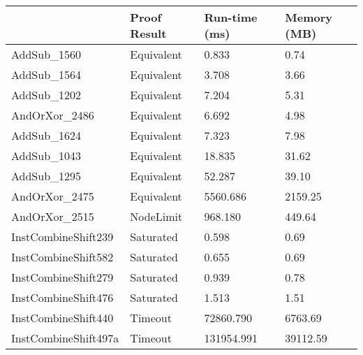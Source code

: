 \begin{tabular}{llll}
\toprule
 & Proof Result & Run-time (ms) & Memory (MB) \\
\midrule
AddSub\_1560 & Equivalent & 0.833 & 0.74 \\
AddSub\_1564 & Equivalent & 3.708 & 3.66 \\
AddSub\_1202 & Equivalent & 7.204 & 5.31 \\
AndOrXor\_2486 & Equivalent & 6.692 & 4.98 \\
AddSub\_1624 & Equivalent & 7.323 & 7.98 \\
AddSub\_1043 & Equivalent & 18.835 & 31.62 \\
AddSub\_1295 & Equivalent & 52.287 & 39.10 \\
AndOrXor\_2475 & Equivalent & 5560.686 & 2159.25 \\
AndOrXor\_2515 & NodeLimit & 968.180 & 449.64 \\
InstCombineShift239 & Saturated & 0.598 & 0.69 \\
InstCombineShift582 & Saturated & 0.655 & 0.69 \\
InstCombineShift279 & Saturated & 0.939 & 0.78 \\
InstCombineShift476 & Saturated & 1.513 & 1.51 \\
InstCombineShift440 & Timeout & 72860.790 & 6763.69 \\
InstCombineShift497a & Timeout & 131954.991 & 39112.59 \\
\bottomrule
\end{tabular}
